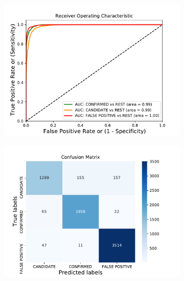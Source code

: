 \begin{figure}[H]
                \centering
                \begin{subfigure}{.49\textwidth}
                \includegraphics[width = 1\textwidth]{data/RF_vif_cap2_overfit_roc.pdf}
                \end{subfigure}
                \begin{subfigure}{.49\textwidth}
                \includegraphics[width = 1\textwidth]{data/RF_vif_cap2_overfit_cm.pdf}
                \end{subfigure}
                \begin{subfigure}{.49\textwidth}

\end{subfigure}
\end{figure}
